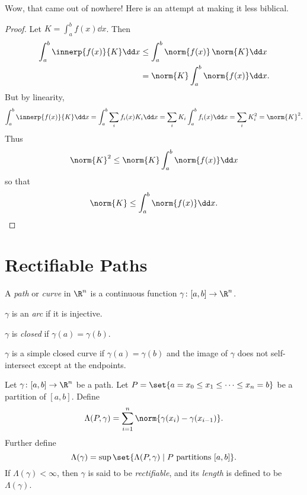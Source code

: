 Wow, that came out of nowhere!
Here is an attempt at making it less biblical.
\begin{proof}
    Let $K = \int_a^b f(x) \dd x$.
    Then \begin{align*}
        \int_a^b \innerp{f(x)}{K} \dd x
            &\le \int_a^b \norm{f(x)} \, \norm{K} \dd x \\
            &= \norm{K} \int_a^b \norm{f(x)} \dd x.
    \end{align*}
    But by linearity, \[
        \int_a^b \innerp{f(x)}{K} \dd x
            = \int_a^b \sum_i f_i(x) K_i \dd x
            = \sum_i K_i \int_a^b f_i(x) \dd x
            = \sum_i K_i^2
            = \norm{K}^2.
    \] Thus \[
        \norm{K}^2 \le \norm{K} \int_a^b \norm{f(x)} \dd x
    \] so that \[
        \norm{K} \le \int_a^b \norm{f(x)} \dd x. \qedhere
    \]
\end{proof}

\section{Rectifiable Paths} \label{sec:rectifiable_paths}
\begin{definition}[Path] \label{def:path}
    A \emph{path} or \emph{curve} in $\R^n$ is a continuous function
    $\gamma\colon [a, b] \to \R^n$.

    $\gamma$ is an \emph{arc} if it is injective.

    $\gamma$ is \emph{closed} if $\gamma(a) = \gamma(b)$.

    $\gamma$ is a simple closed curve if $\gamma(a) = \gamma(b)$ and the
    image of $\gamma$ does not self-intersect except at the endpoints.
\end{definition}

\begin{definition} \label{def:path:length}
    Let $\gamma\colon [a, b] \to \R^n$ be a path.
    Let $P = \set{a = x_0 \le x_1 \le \dots \le x_n = b}$ be a partition
    of $[a, b]$.
    Define \[
        \Lambda(P, \gamma)
            = \sum_{i=1}^n \norm{\gamma(x_i) - \gamma(x_{i-1})}.
    \] Further define \[
        \Lambda(\gamma)
        = \sup\set{\Lambda(P, \gamma) \mid P \text{ partitions } [a, b]}.
    \] If $\Lambda(\gamma) < \infty$, then $\gamma$ is said to be
    \emph{rectifiable}, and its \emph{length} is defined to be
    $\Lambda(\gamma)$.
\end{definition}

